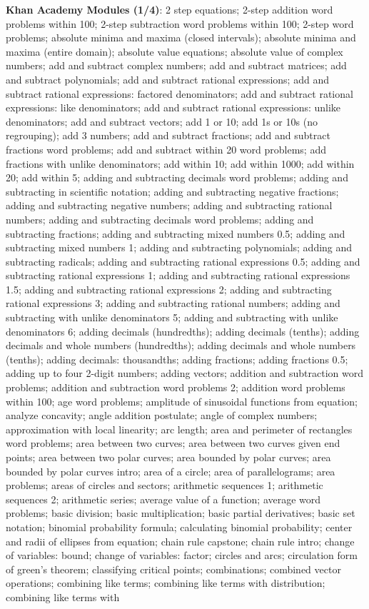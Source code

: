 \documentclass{article}
\begin{document}
\begin{figure*}
\textbf{Khan Academy Modules (1/4)}:
2 step equations; 2-step addition word problems within 100; 2-step subtraction word problems within 100; 2-step word problems; absolute minima and maxima (closed intervals); absolute minima and maxima (entire domain); absolute value equations; absolute value of complex numbers; add and subtract complex numbers; add and subtract matrices; add and subtract polynomials; add and subtract rational expressions; add and subtract rational expressions: factored denominators; add and subtract rational expressions: like denominators; add and subtract rational expressions: unlike denominators; add and subtract vectors; add 1 or 10; add 1s or 10s (no regrouping); add 3 numbers; add and subtract fractions; add and subtract fractions word problems; add and subtract within 20 word problems; add fractions with unlike denominators; add within 10; add within 1000; add within 20; add within 5; adding and subtracting decimals word problems; adding and subtracting in scientific notation; adding and subtracting negative fractions; adding and subtracting negative numbers; adding and subtracting rational numbers; adding and subtracting decimals word problems; adding and subtracting fractions; adding and subtracting mixed numbers 0.5; adding and subtracting mixed numbers 1; adding and subtracting polynomials; adding and subtracting radicals; adding and subtracting rational expressions 0.5; adding and subtracting rational expressions 1; adding and subtracting rational expressions 1.5; adding and subtracting rational expressions 2; adding and subtracting rational expressions 3; adding and subtracting rational numbers; adding and subtracting with unlike denominators 5; adding and subtracting with unlike denominators 6; adding decimals (hundredths); adding decimals (tenths); adding decimals and whole numbers (hundredths); adding decimals and whole numbers (tenths); adding decimals: thousandths; adding fractions; adding fractions 0.5; adding up to four 2-digit numbers; adding vectors; addition and subtraction word problems; addition and subtraction word problems 2; addition word problems within 100; age word problems; amplitude of sinusoidal functions from equation; analyze concavity; angle addition postulate; angle of complex numbers; approximation with local linearity; arc length; area and perimeter of rectangles word problems; area between two curves; area between two curves given end points; area between two polar curves; area bounded by polar curves; area bounded by polar curves intro; area of a circle; area of parallelograms; area problems; areas of circles and sectors; arithmetic sequences 1; arithmetic sequences 2; arithmetic series; average value of a function; average word problems; basic division; basic multiplication; basic partial derivatives; basic set notation; binomial probability formula; calculating binomial probability; center and radii of ellipses from equation; chain rule capstone; chain rule intro; change of variables: bound; change of variables: factor; circles and arcs; circulation form of green's theorem; classifying critical points; combinations; combined vector operations; combining like terms; combining like terms with distribution; combining like terms with 
\end{figure*}
\end{document}
